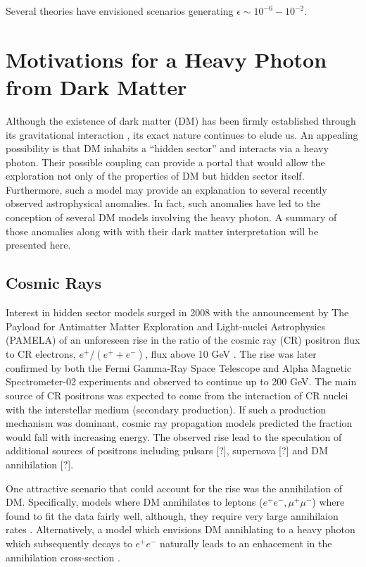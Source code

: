 Several theories have envisioned scenarios generating 
$\epsilon \sim 10^{-6} - 10^{-2}$.

\section{Motivations for a Heavy Photon from Dark Matter}

Although the existence of dark matter (DM) has been firmly established through its
gravitational interaction \cite{popolo2014}, its exact nature continues to elude
us.  An appealing
possibility is that DM inhabits a ``hidden sector'' and interacts via a heavy
photon.  Their possible coupling can provide a portal that would allow the
exploration not only of the properties of DM but hidden sector itself.  Furthermore, such a
model may provide an explanation to several recently observed astrophysical
anomalies.  In fact, such anomalies have led to the conception of several DM
models involving the heavy photon.  A summary of those anomalies along with 
with their dark matter interpretation will be presented here.

\subsection{Cosmic Rays}

Interest in hidden sector models surged in 2008 with the announcement by 
The Payload for Antimatter Matter Exploration and Light-nuclei Astrophysics 
(PAMELA) of an unforeseen rise in the ratio of the cosmic ray (CR) positron flux
to CR electrons, $e^{+}/(e^{+} + e^{-})$, flux above 10 GeV \cite{pamela2008}.
The rise was later confirmed by both the 
Fermi Gamma-Ray Space Telescope \cite{Ackermann2012} and Alpha Magnetic 
Spectrometer-02 \cite{Aguilar2013} experiments and observed to continue
up to 200 GeV. The main source of CR positrons 
was expected to come from the interaction of CR nuclei with the interstellar 
medium (secondary production).  If such a production mechanism was dominant, 
cosmic ray propagation models predicted the fraction would fall with increasing
energy.  The observed rise lead to the speculation of additional sources of 
positrons including pulsars [?], supernova [?] and DM annihilation [?].

One attractive scenario that could account for the rise was the annihilation of
DM.  Specifically, models where DM annihilates to leptons ($e^+e^-, \mu^+\mu^-$)
where found to fit the data fairly well, although, they
require very large annihilaion rates \cite{Cholis2009}. Alternatively, a model
which envisions DM annihlating to a heavy photon which subsequently decays to 
$e^+e^-$ naturally leads to an enhacement in the 
annihilation cross-section \cite{Arkani-Hamed2009}.

